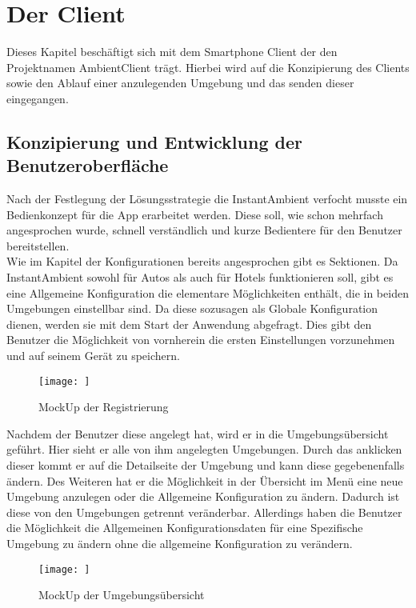 \chapter{Der Client}
Dieses Kapitel beschäftigt sich mit dem Smartphone Client der den Projektnamen AmbientClient trägt. Hierbei wird auf die Konzipierung des Clients sowie den Ablauf einer anzulegenden Umgebung und das senden dieser eingegangen. 

\section{Konzipierung und Entwicklung der Benutzeroberfläche}
Nach der Festlegung der Lösungsstrategie die InstantAmbient verfocht musste ein Bedienkonzept für die App erarbeitet werden. Diese soll, wie schon mehrfach angesprochen wurde, schnell verständlich und kurze Bedientere für den Benutzer bereitstellen. \\ 
Wie im Kapitel der Konfigurationen bereits angesprochen gibt es Sektionen. Da InstantAmbient sowohl für Autos als auch für Hotels funktionieren soll, gibt es eine Allgemeine Konfiguration die elementare Möglichkeiten enthält, die in beiden Umgebungen einstellbar sind. Da diese sozusagen als Globale Konfiguration dienen, werden sie mit dem Start der Anwendung abgefragt. Dies gibt den Benutzer die Möglichkeit von vornherein die ersten Einstellungen vorzunehmen und auf seinem Gerät zu speichern.  

\begin{figure}[H]
\texttt{[image: ]}
\caption{MockUp der Registrierung}
\end{figure}

Nachdem der Benutzer diese angelegt hat, wird er in die Umgebungsübersicht geführt. Hier sieht er alle von ihm angelegten Umgebungen. Durch das anklicken dieser kommt er auf die Detailseite der Umgebung und kann diese gegebenenfalls ändern.       
Des Weiteren hat er die Möglichkeit in der Übersicht im Menü eine neue Umgebung anzulegen oder die Allgemeine Konfiguration zu ändern. Dadurch ist diese von den Umgebungen getrennt veränderbar. Allerdings haben die Benutzer die Möglichkeit die Allgemeinen Konfigurationsdaten für eine Spezifische Umgebung zu ändern ohne die allgemeine Konfiguration zu verändern. 

\begin{figure}[H]
\texttt{[image: ]}
\caption{MockUp der Umgebungsübersicht}
\end{figure}

